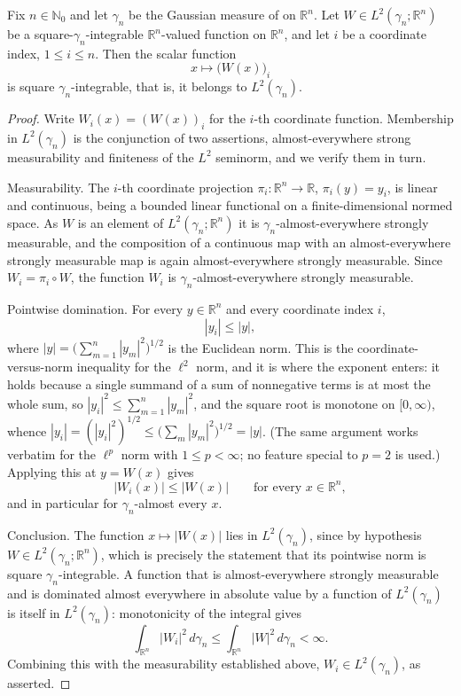 \begin{lemma}
Fix $n \in \mathbb{N}_0$ and let $\gamma_n$ be the Gaussian measure of
 on $\mathbb{R}^n$.  Let
$W \in L^2(\gamma_n; \mathbb{R}^n)$ be a square-$\gamma_n$-integrable
$\mathbb{R}^n$-valued function on $\mathbb{R}^n$, and let $i$ be a coordinate
index, $1 \leq i \leq n$.  Then the scalar function
\[
  x \longmapsto \bigl(W(x)\bigr)_i
\]
is square $\gamma_n$-integrable, that is, it belongs to $L^2(\gamma_n)$.
\end{lemma}
\begin{proof}
Write $W_i(x) = (W(x))_i$ for the $i$-th coordinate function.  Membership in
$L^2(\gamma_n)$ is the conjunction of two assertions, almost-everywhere strong
measurability and finiteness of the $L^2$ seminorm, and we verify them in turn.

Measurability.  The $i$-th coordinate projection
$\pi_i : \mathbb{R}^n \to \mathbb{R}$, $\pi_i(y) = y_i$, is linear and
continuous, being a bounded linear functional on a finite-dimensional normed
space.  As $W$ is an element of $L^2(\gamma_n;\mathbb{R}^n)$ it is
$\gamma_n$-almost-everywhere strongly measurable, and the composition of a
continuous map with an almost-everywhere strongly measurable map is again
almost-everywhere strongly measurable.  Since $W_i = \pi_i \circ W$, the
function $W_i$ is $\gamma_n$-almost-everywhere strongly measurable.

Pointwise domination.  For every $y \in \mathbb{R}^n$ and every coordinate index
$i$,
\[
  |y_i| \leq |y| ,
\]
where $|y| = \bigl(\sum_{m=1}^n |y_m|^2\bigr)^{1/2}$ is the Euclidean norm.  This
is the coordinate-versus-norm inequality for the $\ell^2$ norm, and it is where
the exponent enters: it holds because a single summand of a sum of nonnegative
terms is at most the whole sum, so $|y_i|^2 \leq \sum_{m=1}^n |y_m|^2$, and the
square root is monotone on $[0,\infty)$, whence
$|y_i| = (|y_i|^2)^{1/2} \leq \bigl(\sum_m |y_m|^2\bigr)^{1/2} = |y|$.  (The
same argument works verbatim for the $\ell^p$ norm with $1 \le p < \infty$; no
feature special to $p = 2$ is used.)  Applying this at $y = W(x)$ gives
\[
  |W_i(x)| \leq |W(x)| \qquad \text{for every } x \in \mathbb{R}^n ,
\]
and in particular for $\gamma_n$-almost every $x$.

Conclusion.  The function $x \mapsto |W(x)|$ lies in $L^2(\gamma_n)$, since by
hypothesis $W \in L^2(\gamma_n;\mathbb{R}^n)$, which is precisely the statement
that its pointwise norm is square $\gamma_n$-integrable.  A function that is
almost-everywhere strongly measurable and is dominated almost everywhere in
absolute value by a function of $L^2(\gamma_n)$ is itself in $L^2(\gamma_n)$:
monotonicity of the integral gives
\[
  \int_{\mathbb{R}^n} |W_i|^2 \, d\gamma_n
    \leq \int_{\mathbb{R}^n} |W|^2 \, d\gamma_n < \infty .
\]
Combining this with the measurability established above, $W_i \in L^2(\gamma_n)$,
as asserted.
\end{proof}
